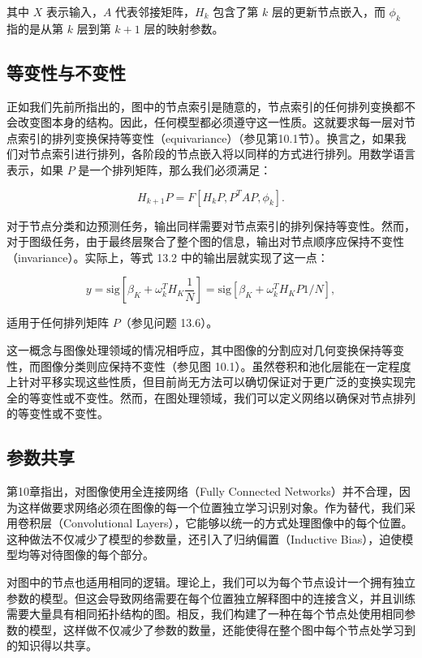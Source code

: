 \documentclass[lang=cn,newtx,10pt,scheme=chinese]{elegantbook}
\begin{document}
其中 \(X\) 表示输入，\(A\) 代表邻接矩阵，\(H_k\) 包含了第 \(k\) 层的更新节点嵌入，而 \(\phi_k\) 指的是从第 \(k\) 层到第 \(k+1\) 层的映射参数。

\subsection{等变性与不变性}
正如我们先前所指出的，图中的节点索引是随意的，节点索引的任何排列变换都不会改变图本身的结构。因此，任何模型都必须遵守这一性质。这就要求每一层对节点索引的排列变换保持等变性（equivariance）（参见第10.1节）。换言之，如果我们对节点索引进行排列，各阶段的节点嵌入将以同样的方式进行排列。用数学语言表示，如果 \(P\) 是一个排列矩阵，那么我们必须满足：

\begin{equation}
H_{k+1}P = F[H_kP, P^TAP, \phi_k]. 
\end{equation}

对于节点分类和边预测任务，输出同样需要对节点索引的排列保持等变性。然而，对于图级任务，由于最终层聚合了整个图的信息，输出对节点顺序应保持不变性（invariance）。实际上，等式 13.2 中的输出层就实现了这一点：

\begin{equation}
y = \text{sig}[\beta_K + \omega_k^T H_K \frac{1}{N}] = \text{sig}[\beta_K + \omega_k^T H_KP1/N], 
\end{equation}

适用于任何排列矩阵 \(P\)（参见问题 13.6）。

这一概念与图像处理领域的情况相呼应，其中图像的分割应对几何变换保持等变性，而图像分类则应保持不变性（参见图 10.1）。虽然卷积和池化层能在一定程度上针对平移实现这些性质，但目前尚无方法可以确切保证对于更广泛的变换实现完全的等变性或不变性。然而，在图处理领域，我们可以定义网络以确保对节点排列的等变性或不变性。
\subsection{参数共享}
第10章指出，对图像使用全连接网络（Fully Connected Networks）并不合理，因为这样做要求网络必须在图像的每一个位置独立学习识别对象。作为替代，我们采用卷积层（Convolutional Layers），它能够以统一的方式处理图像中的每个位置。这种做法不仅减少了模型的参数量，还引入了归纳偏置（Inductive Bias），迫使模型均等对待图像的每个部分。

对图中的节点也适用相同的逻辑。理论上，我们可以为每个节点设计一个拥有独立参数的模型。但这会导致网络需要在每个位置独立解释图中的连接含义，并且训练需要大量具有相同拓扑结构的图。相反，我们构建了一种在每个节点处使用相同参数的模型，这样做不仅减少了参数的数量，还能使得在整个图中每个节点处学习到的知识得以共享。
\end{document}

